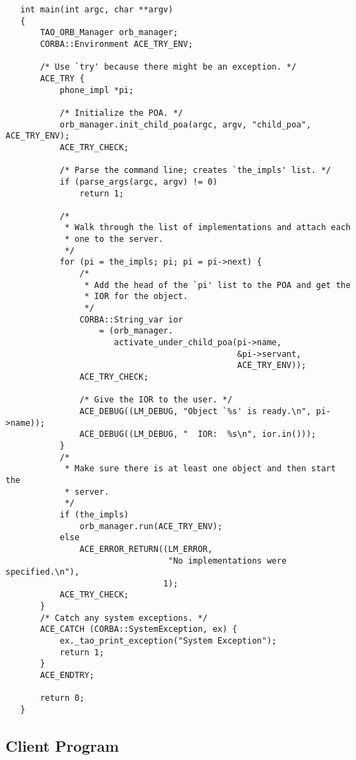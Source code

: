 \begin{verbatim}
   int main(int argc, char **argv)
   {
       TAO_ORB_Manager orb_manager;
       CORBA::Environment ACE_TRY_ENV;

       /* Use `try' because there might be an exception. */
       ACE_TRY {
           phone_impl *pi;

           /* Initialize the POA. */
           orb_manager.init_child_poa(argc, argv, "child_poa", ACE_TRY_ENV);
           ACE_TRY_CHECK;

           /* Parse the command line; creates `the_impls' list. */
           if (parse_args(argc, argv) != 0)
               return 1;

           /*
            * Walk through the list of implementations and attach each
            * one to the server.
            */
           for (pi = the_impls; pi; pi = pi->next) {
               /*
                * Add the head of the `pi' list to the POA and get the
                * IOR for the object.
                */
               CORBA::String_var ior
                   = (orb_manager.
                      activate_under_child_poa(pi->name,
                                               &pi->servant,
                                               ACE_TRY_ENV));
               ACE_TRY_CHECK;

               /* Give the IOR to the user. */
               ACE_DEBUG((LM_DEBUG, "Object `%s' is ready.\n", pi->name));
               ACE_DEBUG((LM_DEBUG, "  IOR:  %s\n", ior.in()));
           }
           /*
            * Make sure there is at least one object and then start the
            * server.
            */
           if (the_impls)
               orb_manager.run(ACE_TRY_ENV);
           else
               ACE_ERROR_RETURN((LM_ERROR,
                                 "No implementations were specified.\n"),
                                1);
           ACE_TRY_CHECK;
       }
       /* Catch any system exceptions. */
       ACE_CATCH (CORBA::SystemException, ex) {
           ex._tao_print_exception("System Exception");
           return 1;
       }
       ACE_ENDTRY;

       return 0;
   }
\end{verbatim}



\subsection{Client Program}
\label{subsec:CORBAXX:Client Program}

